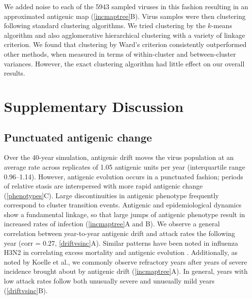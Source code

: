 We added noise to each of the 5943 sampled viruses in this fashion resulting in an approximated antigenic map (\ref{incmaptree}B).  Virus samples were then clustering following standard clustering algorithms.  We tried clustering by the $k$-means algorithm and also agglomerative hierarchical clustering with a variety of linkage criterion.  We found that clustering by Ward's criterion consistently outperformed other methods, when measured in terms of within-cluster and between-cluster variances.  However, the exact clustering algorithm had little effect on our overall results.

\section*{Supplementary Discussion}

\subsection*{Punctuated antigenic change}

Over the  40-year simulation, antigenic drift moves the virus population at an average rate across replicates of 1.05 antigenic units per year (interquartile range 0.96--1.14).  However, antigenic evolution occurs in a punctuated fashion; periods of relative stasis are interspersed with more rapid antigenic change (\ref{phenotypes}C).  Large discontinuities in antigenic phenotype frequently correspond to cluster transition events.  Antigenic and epidemiological dynamics show a fundamental linkage, so that large jumps of antigenic phenotype result in increased rates of infection (\ref{incmaptree}A and B).  We observe a general correlation between year-to-year antigenic drift and attack rates the following year (corr = 0.27, \ref{driftvsinc}A).  Similar patterns have been noted in influenza H3N2 in correlating excess mortality and antigenic evolution .  Additionally, as noted by Koelle et al.\cite{Koelle06}, we commonly observe refractory years after years of severe incidence brought about by antigenic drift (\ref{incmaptree}A).  In general, years with low attack rates follow both unusually severe and unusually mild years (\ref{driftvsinc}B).  

